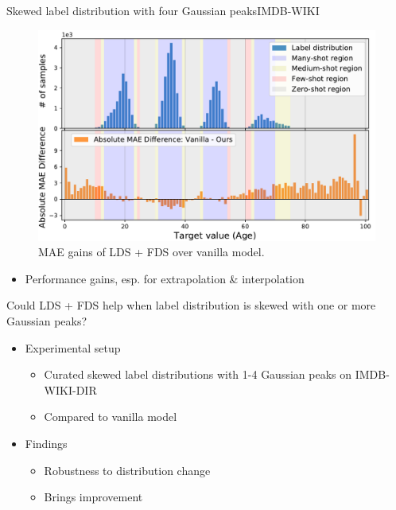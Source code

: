 \begin{frame}{Skewed label distribution with four Gaussian peaks}{IMDB-WIKI}
	\begin{figure}[h]
		\includegraphics[width=0.7\linewidth]{images/interp_extrap_diff_peak4.pdf}
		\caption{MAE gains of LDS + FDS over vanilla model.}
	\end{figure}
	\begin{itemize}
		\item Performance gains, esp. for extrapolation \& interpolation
	\end{itemize}
\end{frame}

\begin{frame}{Could LDS + FDS help when label distribution is skewed with one or more Gaussian peaks?}
	\begin{itemize}\setlength\itemsep{1.5em}
		\item Experimental setup
		\begin{itemize}
			\item Curated skewed label distributions with 1-4 Gaussian peaks on IMDB-WIKI-DIR
			\item Compared to vanilla model
		\end{itemize}
		\item Findings
		\begin{itemize}
			\item Robustness to distribution change
			\item Brings improvement
		\end{itemize}
	\end{itemize}
\end{frame}

